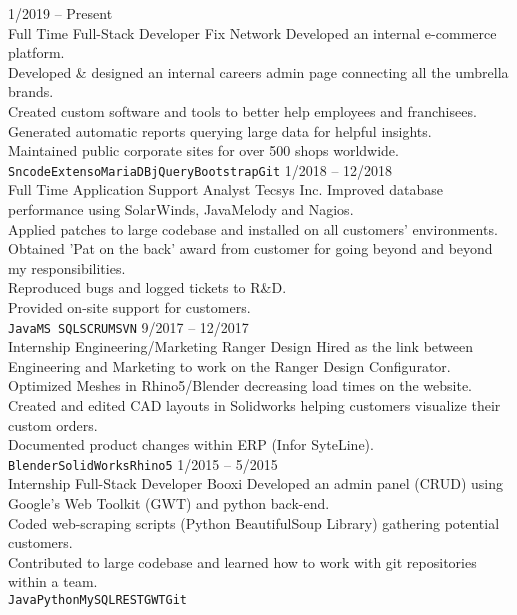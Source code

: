 \documentclass[9pt]{developercv} %
\begin{document}
\begin{entrylist}
	\entry
		{1/2019 -- Present\\\footnotesize{Full Time}}
		{Full-Stack Developer}
		{Fix Network}
		{Developed an internal e-commerce platform.\\
      Developed \& designed an internal careers admin page connecting all the umbrella brands.\\
      Created custom software and tools to better help employees and franchisees.\\
      Generated automatic reports querying large data for helpful insights.\\ 
      Maintained public corporate sites for over 500 shops worldwide.
      \\\texttt{Sncode}\slashsep\texttt{Extenso}\slashsep\texttt{MariaDB}\slashsep\texttt{jQuery}\slashsep\texttt{Bootstrap}\slashsep\texttt{Git}}
	\entry
		{1/2018 -- 12/2018\\\footnotesize{Full Time}}
		{Application Support Analyst}
		{Tecsys Inc.}
		{Improved database performance using SolarWinds, JavaMelody and Nagios.\\
      Applied patches to large codebase and installed on all customers' environments.\\
      Obtained 'Pat on the back' award from customer for going beyond and beyond my responsibilities.\\
      Reproduced bugs and logged tickets to R\&D.\\
      Provided on-site support for customers.
      \\\texttt{Java}\slashsep\texttt{MS SQL}\slashsep\texttt{SCRUM}\slashsep\texttt{SVN}}
	\entry
		{9/2017 -- 12/2017\\\footnotesize{Internship}}
		{Engineering/Marketing}
		{Ranger Design}
    {Hired as the link between Engineering and Marketing to work on the Ranger Design Configurator.\\
      Optimized Meshes in Rhino5/Blender decreasing load times on the website.\\
      Created and edited CAD layouts in Solidworks helping customers visualize their custom orders.\\
      Documented product changes within ERP (Infor SyteLine). 
      \\\texttt{Blender}\slashsep\texttt{SolidWorks}\slashsep\texttt{Rhino5}}
	\entry
		{1/2015 -- 5/2015\\\footnotesize{Internship}}
		{Full-Stack Developer}
		{Booxi}
    {Developed an admin panel (CRUD) using Google's Web Toolkit (GWT) and python back-end.\\
      Coded web-scraping scripts (Python BeautifulSoup Library) gathering potential customers.\\
      Contributed to large codebase and learned how to work with git repositories within a team.
      \\\texttt{Java}\slashsep\texttt{Python}\slashsep\texttt{MySQL}\slashsep\texttt{REST}\slashsep\texttt{GWT}\slashsep\texttt{Git}}
\end{entrylist}
\end{document}
